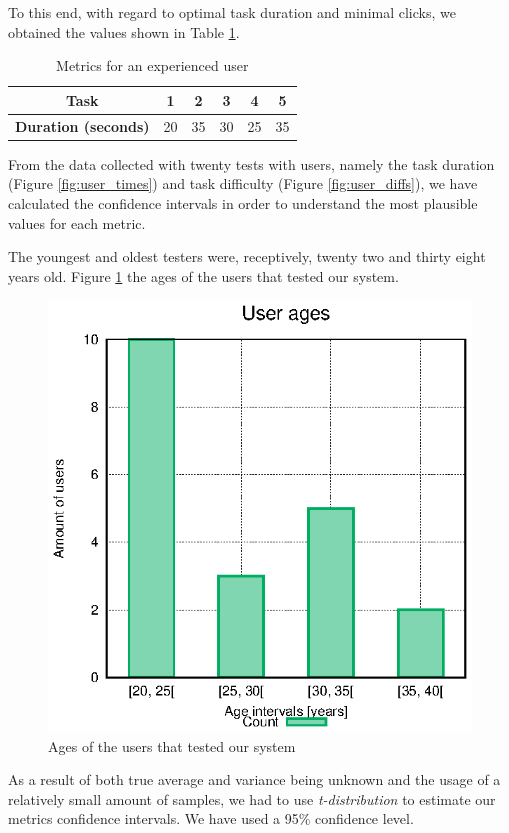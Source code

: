 \documentclass[conference,compsoc,a4paper]{IEEEtran}
\begin{document}
To this end, with regard to optimal task duration and minimal clicks, we obtained the values shown in Table \ref{table:optimal}.


\begin{table}[H]
\centering
\caption{Metrics for an experienced user}
\label{table:optimal}
\begin{tabular}{|c|c|c|c|c|c|}
\hline
\textbf{Task} & 1 & 2 & 3 & 4 & 5 \\ \hline
\textbf{Duration (seconds)} & 20 & 35 & 30 & 25 & 35 \\ \hline
\end{tabular}
\end{table}


From the data collected with twenty tests with users, namely the task duration (Figure \ref{fig:user_times}) and task difficulty (Figure \ref{fig:user_diffs}), we have calculated the confidence intervals in order to understand the most plausible values for each metric.

The youngest and oldest testers were, receptively, twenty two and thirty eight years old. Figure \ref{fig:user_ages} the ages of the users that tested our system.

\begin{figure}
  \centering
  \includegraphics[width=0.8\linewidth]{stats/user_ages.eps}
  \caption{Ages of the users that tested our system}
  \label{fig:user_ages}
\end{figure}

As a result of both true average and variance being unknown and the usage of a relatively small amount of samples, we had to use \emph{t-distribution} to estimate our metrics confidence intervals. We have used a 95\% confidence level.
\end{document}
